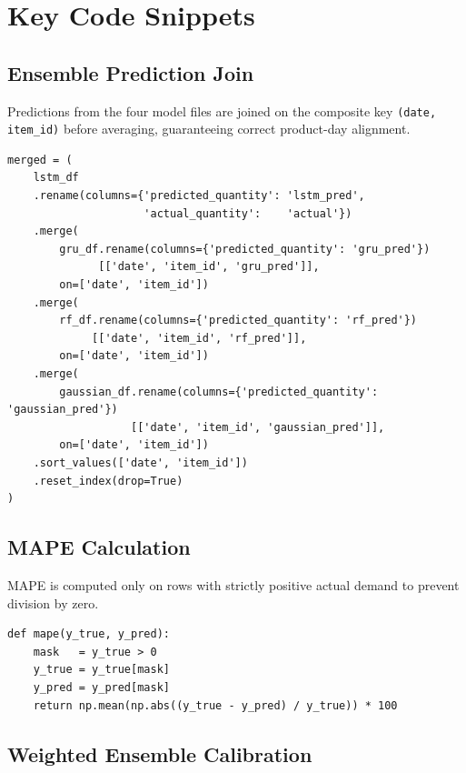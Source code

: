 \documentclass[12pt, a4paper]{article}
\begin{document}
\newpage
\section{Key Code Snippets}
\label{app:code}

\subsection{Ensemble Prediction Join}

Predictions from the four model files are joined on the composite key
\texttt{(date, item\_id)} before averaging, guaranteeing correct product-day alignment.

\begin{lstlisting}[caption={Inner-join of all four model prediction files.},
                   label=lst:join]
merged = (
    lstm_df
    .rename(columns={'predicted_quantity': 'lstm_pred',
                     'actual_quantity':    'actual'})
    .merge(
        gru_df.rename(columns={'predicted_quantity': 'gru_pred'})
              [['date', 'item_id', 'gru_pred']],
        on=['date', 'item_id'])
    .merge(
        rf_df.rename(columns={'predicted_quantity': 'rf_pred'})
             [['date', 'item_id', 'rf_pred']],
        on=['date', 'item_id'])
    .merge(
        gaussian_df.rename(columns={'predicted_quantity': 'gaussian_pred'})
                   [['date', 'item_id', 'gaussian_pred']],
        on=['date', 'item_id'])
    .sort_values(['date', 'item_id'])
    .reset_index(drop=True)
)
\end{lstlisting}

\subsection{MAPE Calculation}

MAPE is computed only on rows with strictly positive actual demand to prevent division by
zero.

\begin{lstlisting}[caption={MAPE with zero-demand masking.}, label=lst:mape]
def mape(y_true, y_pred):
    mask   = y_true > 0
    y_true = y_true[mask]
    y_pred = y_pred[mask]
    return np.mean(np.abs((y_true - y_pred) / y_true)) * 100
\end{lstlisting}

\subsection{Weighted Ensemble Calibration}
\end{document}
